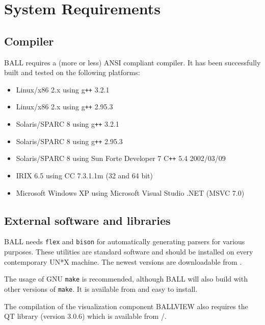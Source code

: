 \section{System Requirements}

\subsection{Compiler}
  BALL requires a (more or less) ANSI compliant \CPP compiler.
  It has been successfully built and tested on the following platforms:
	\begin{itemize}	
   	\item Linux/x86 2.x using g{\tt ++} 3.2.1
   	\item Linux/x86 2.x using g{\tt ++} 2.95.3
   	\item Solaris/SPARC 8 using g{\tt ++} 3.2.1
   	\item Solaris/SPARC 8 using g{\tt ++} 2.95.3
   	\item Solaris/SPARC 8 using Sun Forte Developer 7 C{\tt ++} 5.4 2002/03/09
   	\item IRIX 6.5 using CC 7.3.1.1m (32 and 64 bit)
		\item Microsoft Windows XP using Microsoft Visual Studio .NET (MSVC 7.0)
 	\end{itemize}

\subsection{External software and libraries}
BALL needs {\tt flex} and {\tt bison} for automatically generating parsers
for various purposes. These utilities are standard software and should be
installed on every contemporary UN*X machine. The newest versions are
downloadable from .

The usage of GNU {\tt make} is recommended, although BALL will also build with
other versions of {\tt make}. It is available from 
and easy to install.

The compilation of the visualization component BALLVIEW also requires
the QT library (version 3.0.6) which is available from
/.

